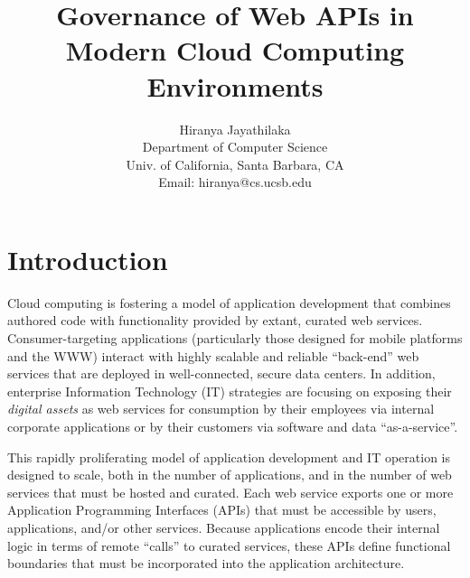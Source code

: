 \documentclass[10pt]{article}
\begin{document}
\date{}

\title{Governance of Web APIs in Modern Cloud Computing Environments}

\author{Hiranya Jayathilaka\\
Department of Computer Science\\
Univ. of California, Santa Barbara, CA\\
Email: hiranya@cs.ucsb.edu
}
\maketitle

\section{Introduction}
Cloud computing is fostering a model of 
application development that combines authored code with functionality
provided by extant, curated web services.  Consumer-targeting applications 
(particularly those designed for mobile platforms and the WWW) interact with highly
scalable and reliable ``back-end'' web services that are deployed
in well-connected, secure data centers.  In addition, enterprise
Information Technology (IT) strategies are focusing on 
exposing their {\em digital assets} as
web services for consumption
by their employees via internal corporate applications or
by their customers via software and data ``as-a-service''.

This rapidly proliferating model of application development and IT operation
is designed to scale, both in the number of applications, 
and in the number of web services that must be
hosted and curated.  Each web service exports one or more Application Programming
Interfaces (APIs) that must be accessible by users, applications, and/or
other services.
Because applications encode their internal logic in terms of
remote ``calls'' to curated services,
these APIs define functional boundaries that must be incorporated into the
application architecture.  

\end{document}
